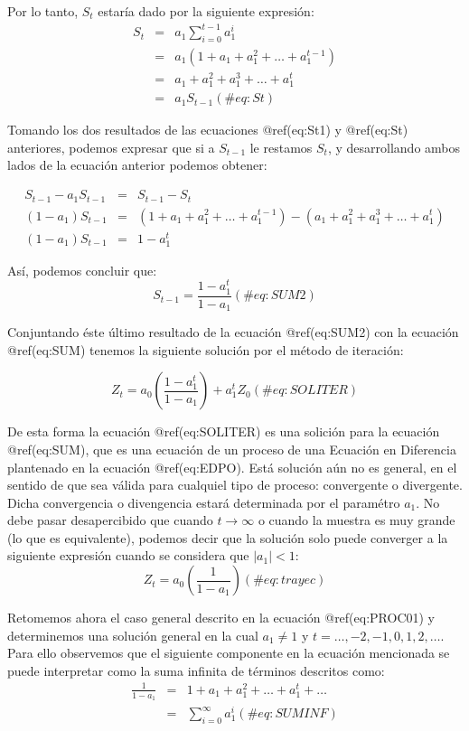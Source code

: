 \documentclass[
  a4paper,
]{article}
\begin{document}
Por lo tanto, \(S_t\) estaría dado por la siguiente expresión:
\begin{eqnarray}
S_{t} & = & a_1 \sum^{t-1}_{i = 0}{a^i_1} \nonumber \\
      & = & a_1 (1 + a_1 + a^2_1 + \ldots + a^{t-1}_1) \nonumber \\
      & = & a_1 + a^2_1 + a^3_1 + \ldots + a^{t}_1 \nonumber \\
      & = & a_1 S_{t-1}
      (\#eq:St)
\end{eqnarray}

Tomando los dos resultados de las ecuaciones @ref(eq:St1) y @ref(eq:St)
anteriores, podemos expresar que si a \(S_{t-1}\) le restamos \(S_t\), y
desarrollando ambos lados de la ecuación anterior podemos obtener:

\begin{eqnarray}
    S_{t-1} - a_1 S_{t-1} & = & S_{t-1} - S_{t} \nonumber \\
    (1 - a_1) S_{t-1} & = & (1 + a_1 + a^2_1 + \ldots + a^{t-1}_1) - (a_1 + a^2_1 + a^3_1 + \ldots + a^{t}_1) \nonumber \\
    (1 - a_1) S_{t-1} & = & 1 - a^{t}_1 \nonumber
\end{eqnarray}

Así, podemos concluir que: \[
    S_{t-1} = \frac{1 - a^{t}_1}{1 - a_1}
    (\#eq:SUM2)
\]

Conjuntando éste último resultado de la ecuación @ref(eq:SUM2) con la
ecuación @ref(eq:SUM) tenemos la siguiente solución por el método de
iteración:

\[
    Z_t = a_0 \left( \frac{1 - a^{t}_1}{1 - a_1} \right) + a^t_1 Z_0
    (\#eq:SOLITER)
\]

De esta forma la ecuación @ref(eq:SOLITER) es una solición para la
ecuación @ref(eq:SUM), que es una ecuación de un proceso de una Ecuación
en Diferencia plantenado en la ecuación @ref(eq:EDPO). Está solución aún
no es general, en el sentido de que sea válida para cualquiel tipo de
proceso: convergente o divergente. Dicha convergencia o divengencia
estará determinada por el paramétro \(a_1\). No debe pasar desapercibido
que cuando \(t \rightarrow \infty\) o cuando la muestra es muy grande
(lo que es equivalente), podemos decir que la solución solo puede
converger a la siguiente expresión cuando se considera que
\(|a_1| < 1\): \[
    Z_t = a_0 \left( \frac{1}{1 - a_1} \right)
    (\#eq:trayec)
\]

Retomemos ahora el caso general descrito en la ecuación @ref(eq:PROC01)
y determinemos una solución general en la cual \(a_1 \neq 1\) y
\(t = \ldots, -2, -1, 0, 1, 2, \ldots\). Para ello observemos que el
siguiente componente en la ecuación mencionada se puede interpretar como
la suma infinita de términos descritos como: \begin{eqnarray}
    \frac{1}{1 - a_1} & = & 1 + a_1 + a_1^2 + \ldots + a_1^t + \ldots \nonumber \\
    & = & \sum_{i = 0}^{\infty} a_1^{i}
    (\#eq:SUMINF)
\end{eqnarray}
\end{document}
